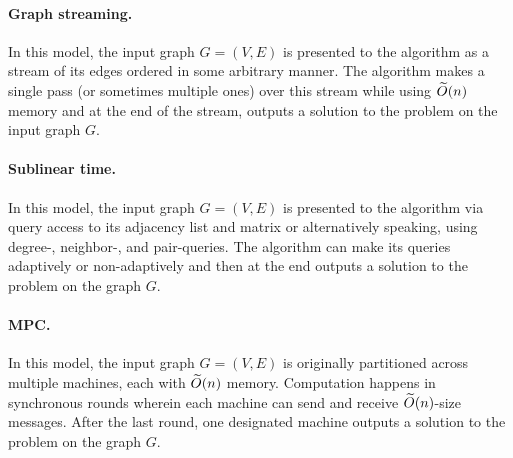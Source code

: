\paragraph{Graph streaming.} In this model, the input graph $G=(V,E)$ is presented to the algorithm as a stream of its edges ordered in some arbitrary manner. 
The algorithm makes a single pass (or sometimes multiple ones) over this stream while using $\widetilde{O}(n)$ memory and at the end of the stream, outputs a solution to the problem on the input graph $G$.  

\paragraph{Sublinear time.} In this model, the input graph $G=(V,E)$ is presented to the algorithm via query access to its adjacency list and matrix or alternatively speaking, using degree-, neighbor-, and pair-queries. 
The algorithm can make its queries adaptively or non-adaptively and then at the end outputs a solution to the problem on the graph $G$. 

\paragraph{MPC.} In this model, the input graph $G=(V,E)$ is originally partitioned across multiple machines, each with $\widetilde{O}(n)$ memory. Computation happens in synchronous rounds wherein each machine can send and receive 
$\widetilde{O}(n)$-size messages. After the last round, one designated machine outputs a solution to the problem on the graph $G$.  
